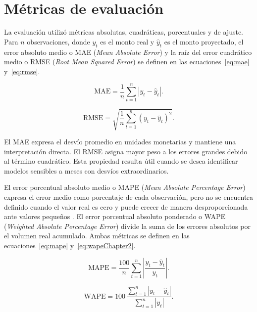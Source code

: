 \section{Métricas de evaluación}
\label{sec:metricasEvaluacion}

La evaluación utilizó métricas absolutas, cuadráticas, porcentuales y de ajuste. Para $n$ observaciones, donde $y_t$ es el monto real y $\hat{y}_t$ es el monto proyectado, el error absoluto medio o MAE (\textit{Mean Absolute Error}) y la raíz del error cuadrático medio o RMSE (\textit{Root Mean Squared Error}) se definen en las ecuaciones~\ref{eq:mae} y~\ref{eq:rmse}.

\begin{equation}
    \label{eq:mae}
    \mathrm{MAE} = \frac{1}{n}\sum_{t=1}^{n}\left|y_t-\hat{y}_t\right|.
\end{equation}

\begin{equation}
    \label{eq:rmse}
    \mathrm{RMSE} = \sqrt{\frac{1}{n}\sum_{t=1}^{n}\left(y_t-\hat{y}_t\right)^2}.
\end{equation}

El MAE expresa el desvío promedio en unidades monetarias y mantiene una interpretación directa. El RMSE asigna mayor peso a los errores grandes debido al término cuadrático. Esta propiedad resulta útil cuando se desea identificar modelos sensibles a meses con desvíos extraordinarios.

El error porcentual absoluto medio o MAPE (\textit{Mean Absolute Percentage Error}) expresa el error medio como porcentaje de cada observación, pero no se encuentra definido cuando el valor real es cero y puede crecer de manera desproporcionada ante valores pequeños \citep{HyndmanKoehler2006}. El error porcentual absoluto ponderado o WAPE (\textit{Weighted Absolute Percentage Error}) divide la suma de los errores absolutos por el volumen real acumulado. Ambas métricas se definen en las ecuaciones~\ref{eq:mape} y~\ref{eq:wapeChapter2}.

\begin{equation}
    \label{eq:mape}
    \mathrm{MAPE} = \frac{100}{n}\sum_{t=1}^{n}\left|\frac{y_t-\hat{y}_t}{y_t}\right|.
\end{equation}

\begin{equation}
    \label{eq:wapeChapter2}
    \mathrm{WAPE} = 100\,\frac{\sum_{t=1}^{n}\left|y_t-\hat{y}_t\right|}
    {\sum_{t=1}^{n}\left|y_t\right|}.
\end{equation}

